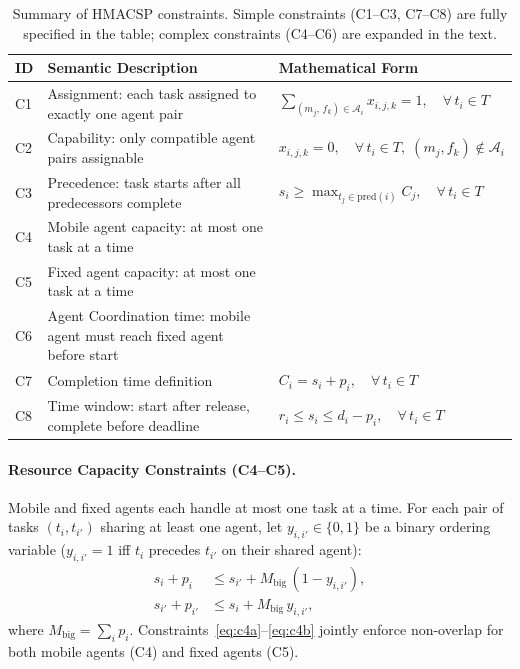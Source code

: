 \documentclass[manuscript,screen,review]{acmart}
\begin{document}
\begin{table}[t]
\centering
\caption{Summary of HMACSP constraints. Simple constraints (C1--C3, C7--C8)
         are fully specified in the table; complex constraints (C4--C6) are
         expanded in the text.}
\label{tab:constraints}
\small
\begin{tabular}{@{}l p{4.2cm} p{5.0cm}@{}}
\toprule
\textbf{ID} & \textbf{Semantic Description} & \textbf{Mathematical Form} \\
\midrule
C1 & Assignment: each task assigned to exactly one agent pair
   & $\displaystyle\sum_{(m_j,\,f_k)\in\mathcal{A}_i} x_{i,j,k} = 1,
     \quad \forall\, t_i \in T$ \\[6pt]
C2 & Capability: only compatible agent pairs assignable
   & $x_{i,j,k} = 0,\quad
     \forall\, t_i \in T,\;(m_j,f_k)\notin\mathcal{A}_i$ \\[6pt]
C3 & Precedence: task starts after all predecessors complete
   & $s_i \geq \max_{t_j\in\mathrm{pred}(i)} C_j,
     \quad \forall\, t_i \in T$ \\[6pt]
C4 & Mobile agent capacity: at most one task at a time & \\[6pt]
C5 & Fixed agent capacity: at most one task at a time & \\[6pt]
C6 & Agent Coordination time: mobile agent must reach fixed agent before start & \\[6pt]
C7 & Completion time definition
   & $C_i = s_i + p_i, \quad \forall\, t_i \in T$ \\[6pt]
C8 & Time window: start after release, complete before deadline
   & $r_i \leq s_i \leq d_i - p_i, \quad \forall\, t_i \in T$ \\
\bottomrule
\end{tabular}
\end{table}

\paragraph{Resource Capacity Constraints (C4--C5).}
Mobile and fixed agents each handle at most one task at a time.
For each pair of tasks $(t_i, t_{i'})$ sharing at least one agent,
let $y_{i,i'} \in \{0,1\}$ be a binary ordering variable
($y_{i,i'}=1$ iff $t_i$ precedes $t_{i'}$ on their shared agent):
\begin{align}
    s_i    + p_i    &\leq s_{i'} + M_{\mathrm{big}}\,(1 - y_{i,i'}),
    \label{eq:c4a} \\
    s_{i'} + p_{i'} &\leq s_i   + M_{\mathrm{big}}\, y_{i,i'},
    \label{eq:c4b}
\end{align}
where $M_{\mathrm{big}} = \sum_{i} p_i$.
Constraints~\eqref{eq:c4a}--\eqref{eq:c4b} jointly enforce non-overlap
for both mobile agents (C4) and fixed agents (C5).
\end{document}

